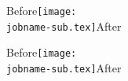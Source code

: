 \documentclass{article}
\begin{document}
Before\texttt{[image: \\jobname-sub.tex]}After

Before\texttt{[image: \\jobname-sub.tex]}After

\fboxsep=0pt
\end{document}

